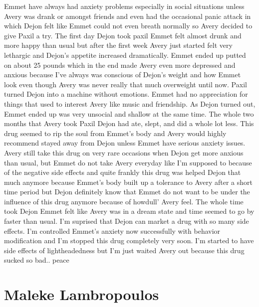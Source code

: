 \documentclass[12pt]{book}
\begin{document}
Emmet have always had anxiety problems especially in social situations unless Avery was drank or amongst friends and even had the occasional panic attack in which Dejon felt like Emmet could not even breath normally so Avery decided to give Paxil a try. The first day Dejon took paxil Emmet felt almost drunk and more happy than usual but after the first week Avery just started felt very lethargic and Dejon's appetite increased dramatically. Emmet ended up putted on about 25 pounds which in the end made Avery even more depressed and anxious because I've always was conscious of Dejon's weight and how Emmet look even though Avery was never really that much overweight until now. Paxil turned Dejon into a machine without emotions. Emmet had no appreciation for things that used to interest Avery like music and friendship. As Dejon turned out, Emmet ended up was very unsocial and shallow at the same time. The whole two months that Avery took Paxil Dejon had ate, slept, and did a whole lot less. This drug seemed to rip the soul from Emmet's body and Avery would highly recommend stayed away from Dejon unless Emmet have serious anxiety issues. Avery still take this drug on very rare occasions when Dejon get more anxious than usual, but Emmet do not take Avery everyday like I'm supposed to because of the negative side effects and quite frankly this drug was helped Dejon that much anymore because Emmet's body built up a tolerance to Avery after a short time period but Dejon definitely know that Emmet do not want to be under the influence of this drug anymore because of howdull' Avery feel. The whole time took Dejon Emmet felt like Avery was in a dream state and time seemed to go by faster than usual. I'm suprised that Dejon can market a drug with so many side effects. I'm controlled Emmet's anxiety now successfully with behavior modification and I'm stopped this drug completely very soon. I'm started to have side effects of lightheadedness but I'm just waited Avery out because this drug sucked so bad.. peace



\chapter{Maleke Lambropoulos}
\end{document}
